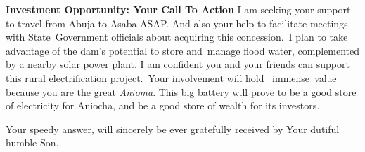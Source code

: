 \begin{fullwidth}
    \textbf{Investment Opportunity: Your Call To Action}
    \vspace{0.2cm}
    I am seeking your support to travel from Abuja to Asaba ASAP. And also your help to facilitate meetings with State\
    Government officials about acquiring this concession.\ I plan to take advantage of the dam's potential to store and\
    manage flood water, complemented by a nearby solar power plant.
    \vspace{0.2cm}
    I am confident you and your friends can support this rural electrification project.\ Your involvement will hold \
    immense\
    value because you are the great \textit{Anioma}.
    \vspace{0.2cm}
    This big battery will prove to be a good store of electricity for Aniocha, and be a good store of wealth for its
    investors.
    \vspace{0.2cm}

    Your speedy answer, will sincerely be ever gratefully received by
    \vspace{0.2cm}
    Your dutiful humble Son.

\end{fullwidth}
\linenumbers